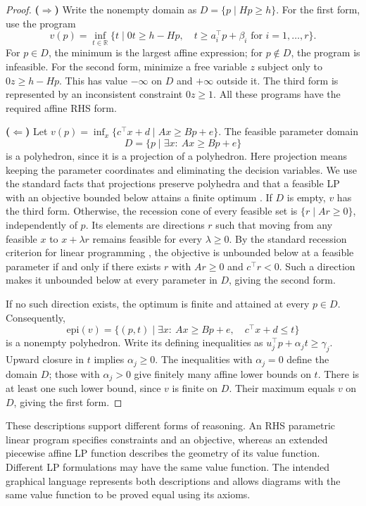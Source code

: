 \begin{proof}
\textbf{($\Rightarrow$)} Write the nonempty domain as
$D=\{p\mid Hp\ge h\}$.
For the first form, use the program
\[
v(p)=\inf_{t\in\mathbb{R}}
\{t\mid 0t\ge h-Hp,\quad
 t\ge a_i^\top p+\beta_i\text{ for }i=1,\dots,r\}.
\]
For $p\in D$, the minimum is the largest affine expression;
for $p\notin D$, the program is infeasible.
For the second form, minimize a free variable $z$ subject only to
$0z\ge h-Hp$. This has value $-\infty$ on $D$ and $+\infty$ outside it.
The third form is represented by an inconsistent constraint $0z\ge1$.
All these programs have the required affine RHS form.

\medskip
\textbf{($\Leftarrow$)} Let
$v(p)=\inf_x\{c^\top x+d\mid Ax\ge Bp+e\}$.
The feasible parameter domain
\[
D=\{p\mid \exists x:\ Ax\ge Bp+e\}
\]
is a polyhedron, since it is a projection of a polyhedron. Here projection
means keeping the parameter coordinates and eliminating the decision variables.
We use the standard facts that projections preserve polyhedra and that a
feasible LP with an objective bounded below attains a finite optimum
\cite{schrijver1986theory}.
If $D$ is empty, $v$ has the third form.
Otherwise, the recession cone of every feasible set is
$\{r\mid Ar\ge0\}$, independently of $p$. Its elements are directions $r$
such that moving from any feasible $x$ to $x+\lambda r$ remains feasible
for every $\lambda\ge0$.
By the standard recession criterion for linear programming
\cite{schrijver1986theory}, the objective
is unbounded below at a feasible parameter if and only if there exists
$r$ with $Ar\ge0$ and $c^\top r<0$.
Such a direction makes it unbounded below at every parameter in $D$,
giving the second form.

If no such direction exists, the optimum is finite and attained at every
$p\in D$. Consequently,
\[
\mathrm{epi}(v)=\{(p,t)\mid \exists x:\
Ax\ge Bp+e,\quad c^\top x+d\le t\}
\]
is a nonempty polyhedron. Write its defining inequalities as
$u_j^\top p+\alpha_j t\ge\gamma_j$.
Upward closure in $t$ implies $\alpha_j\ge0$.
The inequalities with $\alpha_j=0$ define the domain $D$;
those with $\alpha_j>0$ give finitely many affine lower bounds on $t$.
There is at least one such lower bound, since $v$ is finite on $D$.
Their maximum equals $v$ on $D$, giving the first form.
\end{proof}

These descriptions support different forms of reasoning. An RHS parametric
linear program specifies constraints and an objective, whereas an extended
piecewise affine LP function describes the geometry of its value function.
Different LP formulations may have the same value function. The intended
graphical language represents both descriptions and allows diagrams with the
same value function to be proved equal using its axioms.

